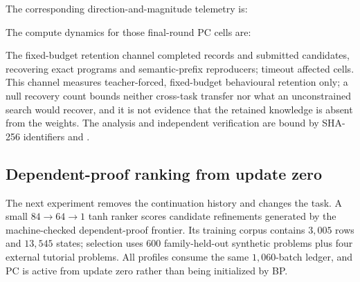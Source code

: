 \documentclass[11pt]{article}
\newcommand{\digestdisplay}[1]{{\scriptsize\ttfamily
  \expandafter\seqsplit\expandafter{#1}}}
\begin{document}
The corresponding direction-and-magnitude telemetry is:
\begin{center}\scriptsize
{}
\end{center}

The compute dynamics for those final-round PC cells are:
\begin{center}\scriptsize
{}
\end{center}

The fixed-budget retention channel completed
\oeisTerminalRetentionRecordsCompleted{} records and submitted
\oeisTerminalRetentionCandidateSubmissions{} candidates, recovering
\oeisTerminalRetentionExactRecoveries{} exact programs and
\oeisTerminalRetentionPrefixRecoveries{} semantic-prefix reproducers; timeout affected
\oeisTerminalRetentionTimedOutCells{} cells. This channel measures teacher-forced,
fixed-budget behavioural retention only; a null recovery count bounds neither
cross-task transfer nor what an unconstrained search would recover, and it is not
evidence that the retained knowledge is absent from the weights. The analysis and independent verification
are bound by SHA-256 identifiers
 \digestdisplay{\oeisTerminalAnalysisSHA} and
 \digestdisplay{\oeisTerminalVerificationSHA}.
\fi

\subsection{Dependent-proof ranking from update zero}
\label{sec:dtt-round0}

The next experiment removes the continuation history and changes the task. A small
$84\!\to\!64\!\to\!1$ tanh ranker scores candidate refinements generated by the
machine-checked dependent-proof frontier. Its training corpus contains $3{,}005$ rows
and $13{,}545$ states; selection uses $600$ family-held-out synthetic problems plus four
external tutorial problems. All profiles consume the same $1{,}060$-batch ledger, and
PC is active from update zero rather than being initialized by BP.
\end{document}
